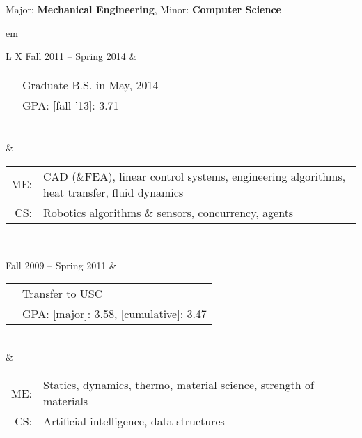 

{\centering \large{Major: \textbf{Mechanical Engineering}, Minor: \textbf{Computer Science}} \par }

	
{ em
\begin{tabu}{ L{\tabularIndent} X } \hhline{==}
	Fall 2011 -- Spring 2014 & 
	\begin{tabular}{ l | l }
		\multirow{2}{*}{\mysubsection{University of Southern California}} & Graduate B.S. in May, 2014 \\
																		  & GPA: [fall '13]: 3.71 \\
	\end{tabular}
	\\
	&
	\setlength{\tabcolsep}{0.0 em}
	\begin{tabular}{ r l }
		ME: \quad &
		CAD (\&FEA), linear control systems, engineering algorithms, heat transfer, fluid dynamics 
		\\
		CS: \quad &
		Robotics algorithms \& sensors, concurrency, agents \\
	\end{tabular}
	
\\ \hhline{==}

	Fall 2009 -- Spring 2011 & 
	\begin{tabular}{ l | l }
		\multirow{2}{*}{\mysubsection{University of Massachusetts, Amherst}} & Transfer to USC \\
																		  & GPA: [major]: 3.58, [cumulative]: 3.47 \\
	\end{tabular}
	\\
	&
	\setlength{\tabcolsep}{0 em}
	\begin{tabular}{ r l }
		ME: \quad &
		Statics, dynamics, thermo, material science, strength of materials
		\\
		CS: \quad &
		Artificial intelligence, data structures \\
	\end{tabular}
\end{tabu}}